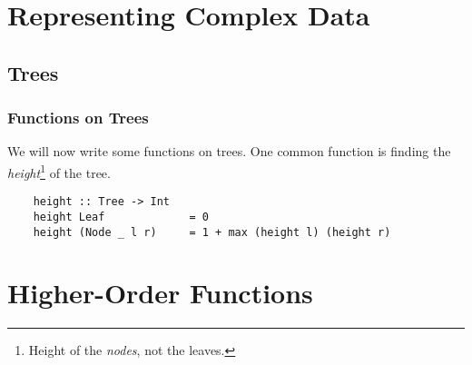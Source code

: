 \documentclass[letterpaper]{article}
\begin{document}
\section{Representing Complex Data}
\subsection{Trees}
\subsubsection{Functions on Trees}
We will now write some functions on trees. One common function is finding the \emph{height}\footnote{Height of the \emph{nodes}, not the leaves.} of the tree. 
\begin{verbatim}
    height :: Tree -> Int 
    height Leaf             = 0 
    height (Node _ l r)     = 1 + max (height l) (height r)
\end{verbatim}


\newpage 
\section{Higher-Order Functions}
\end{document}
